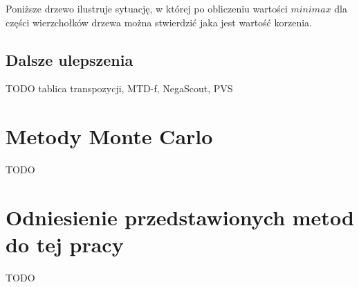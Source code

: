 \documentclass{pracamgr}
\begin{document}
Poniższe drzewo ilustruje sytuację, w której po obliczeniu wartości \(minimax\) dla części wierzchołków drzewa można stwierdzić jaka jest wartość korzenia.

\begin{center}\end{center}

\subsection{Dalsze ulepszenia}

TODO tablica transpozycji, MTD-f, NegaScout, PVS

\section{Metody Monte Carlo}

TODO

\section{Odniesienie przedstawionych metod do tej pracy}

TODO

\begin{thebibliography}{99}
\end{thebibliography}
\end{document}

